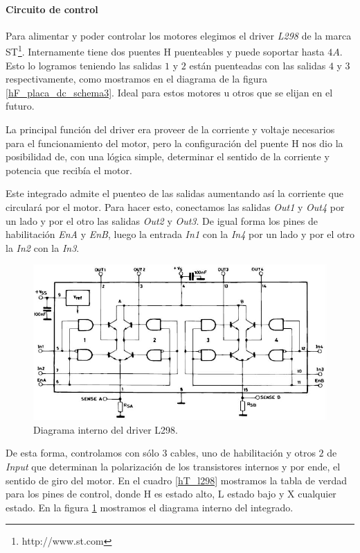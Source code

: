 \paragraph{Circuito de control}
\label{h_actuadores_motorDC_circuito}

Para alimentar y poder controlar los motores elegimos el driver \emph{L298} de la marca ST\footnote{http://www.st.com}.
Internamente tiene dos puentes H puenteables y puede soportar hasta $4 A$.
Esto lo logramos teniendo las salidas $1$ y $2$ est\'an puenteadas con las salidas $4$ y $3$ respectivamente, como
mostramos en el diagrama de la figura \ref{hF_placa_dc_schema3}.
Ideal para estos motores u otros que se elijan en el futuro.

La principal funci\'on del driver era proveer de la corriente y voltaje necesarios para el funcionamiento del motor, pero la configuraci\'on
del puente H nos dio la posibilidad de, con una l\'ogica simple, determinar el sentido de la corriente y potencia que recib\'ia el motor.

Este integrado admite el puenteo de las salidas aumentando as\'i la corriente que circular\'a por el motor.
Para hacer esto, conectamos las salidas \emph{Out1} y \emph{Out4} por un lado y por el otro las salidas \emph{Out2} y \emph{Out3}.
De igual forma los pines de habilitaci\'on \emph{EnA} y \emph{EnB}, luego la entrada \emph{In1} con la \emph{In4} por un lado y
por el otro la \emph{In2} con la \emph{In3}.

\begin{figure}[ht]
	\centering
	\includegraphics[scale=0.40]{figuras/L298.png}
	\caption{Diagrama interno del driver L298.}
	\label{hF_l298}
\end{figure}

De esta forma, controlamos con s\'olo $3$ cables, uno de habilitaci\'on y otros $2$ de \emph{Input} que determinan
la polarizaci\'on de los transistores internos y por ende, el sentido de giro del motor.
En el cuadro \ref{hT_l298} mostramos la tabla de verdad para los pines de control, donde H es estado alto, L estado bajo y X cualquier estado.
En la figura \ref{hF_l298} mostramos el diagrama interno del integrado.


